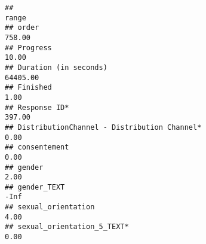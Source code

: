 \documentclass[
]{article}
\begin{document}
\begin{verbatim}
##                                                                                                                                                                                                                               range
## order                                                                                                                                                                                                                        758.00
## Progress                                                                                                                                                                                                                      10.00
## Duration (in seconds)                                                                                                                                                                                                      64405.00
## Finished                                                                                                                                                                                                                       1.00
## Response ID*                                                                                                                                                                                                                 397.00
## DistributionChannel - Distribution Channel*                                                                                                                                                                                    0.00
## consentement                                                                                                                                                                                                                   0.00
## gender                                                                                                                                                                                                                         2.00
## gender_TEXT                                                                                                                                                                                                                    -Inf
## sexual_orientation                                                                                                                                                                                                             4.00
## sexual_orientation_5_TEXT*                                                                                                                                                                                                     0.00

\end{verbatim}
\end{document}
